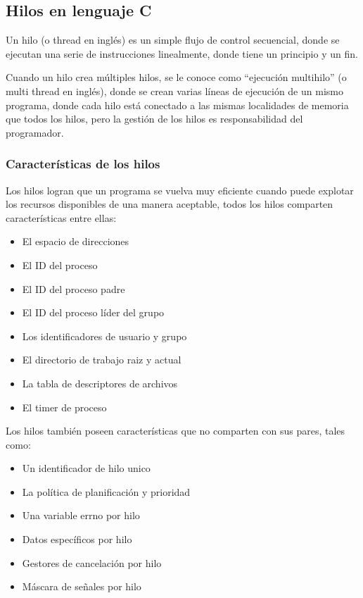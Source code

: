 \subsection{Hilos en lenguaje C}\label{hilos-en-lenguaje-c}

Un hilo (o thread en inglés) es un simple flujo de control secuencial, donde se ejecutan una serie de instrucciones linealmente, donde tiene un principio y un fin.

Cuando un hilo crea múltiples hilos, se le conoce como ``ejecución multihilo'' (o multi thread en inglés), donde se crean varias líneas de ejecución de un mismo programa, donde cada hilo está conectado a las mismas localidades de memoria que todos los hilos, pero la gestión de los hilos es responsabilidad del programador.

\subsubsection{Características de los hilos}\label{caracteruxedsticas-de-los-hilos}

Los hilos logran que un programa se vuelva muy eficiente cuando puede explotar los recursos disponibles de una manera aceptable, todos los hilos comparten características entre ellas:

\begin{itemize} \item   El espacio de direcciones \item   El ID del proceso \item   El ID del proceso padre \item   El ID del proceso líder del grupo \item   Los identificadores de usuario y grupo \item   El directorio de trabajo raiz y actual \item   La tabla de descriptores de archivos \item   El timer de proceso \end{itemize}

Los hilos también poseen características que no comparten con sus pares, tales como:

\begin{itemize} \item   Un identificador de hilo unico \item   La política de planificación y prioridad \item   Una variable errno por hilo \item   Datos específicos por hilo \item   Gestores de cancelación por hilo \item   Máscara de señales por hilo \end{itemize}


